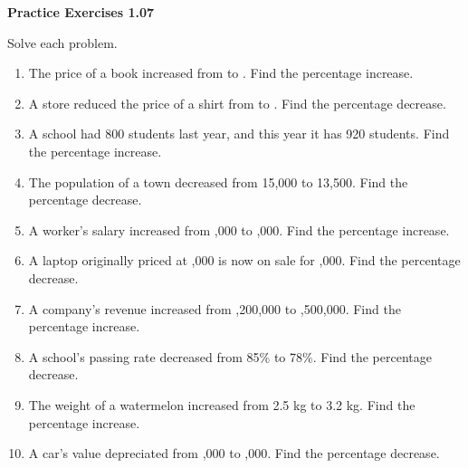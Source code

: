 \vspace{0.3ex}
\noindent\textbf{Practice Exercises 1.07}

\vspace{0.2ex}

Solve each problem.
\begin{enumerate}
    \item The price of a book increased from  to . Find the percentage increase.
    \item A store reduced the price of a shirt from  to . Find the percentage decrease.
    \item A school had 800 students last year, and this year it has 920 students. Find the percentage increase.
    \item The population of a town decreased from 15,000 to 13,500. Find the percentage decrease.
    \item A worker's salary increased from ,000 to ,000. Find the percentage increase.
    \item A laptop originally priced at ,000 is now on sale for ,000. Find the percentage decrease.
    \item A company’s revenue increased from ,200,000 to ,500,000. Find the percentage increase.
    \item A school's passing rate decreased from 85\% to 78\%. Find the percentage decrease.
    \item The weight of a watermelon increased from 2.5 kg to 3.2 kg. Find the percentage increase.
    \item A car’s value depreciated from ,000 to ,000. Find the percentage decrease.
\end{enumerate}
